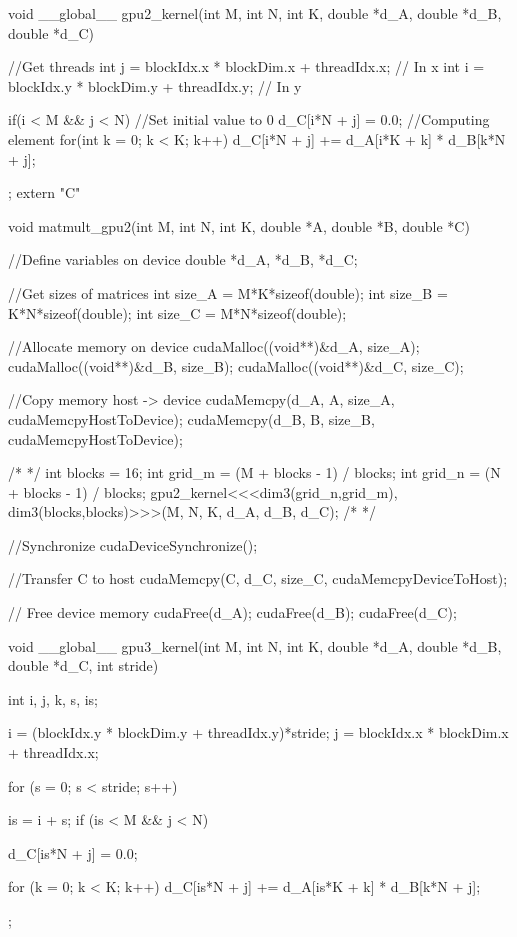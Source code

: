void __global__ gpu2_kernel(int M, int N, int K, double *d_A, double *d_B, double *d_C){
    //Get threads
    int j = blockIdx.x * blockDim.x + threadIdx.x;  // In x
    int i = blockIdx.y * blockDim.y + threadIdx.y;  // In y
    
    if(i < M && j < N) { 
        //Set initial value to 0
        d_C[i*N + j] = 0.0;
        //Computing element
        for(int k = 0; k < K; k++){
            d_C[i*N + j] += d_A[i*K + k] * d_B[k*N + j];
        }
    }
};
extern "C" { 
void matmult_gpu2(int M, int N, int K, double *A, double *B, double *C) { 

    //Define variables on device
    double *d_A, *d_B, *d_C;

    //Get sizes of matrices
    int size_A = M*K*sizeof(double);
    int size_B = K*N*sizeof(double);
    int size_C = M*N*sizeof(double);

    //Allocate memory on device
    cudaMalloc((void**)&d_A, size_A);
    cudaMalloc((void**)&d_B, size_B);
    cudaMalloc((void**)&d_C, size_C);

    //Copy memory host -> device
    cudaMemcpy(d_A, A, size_A, cudaMemcpyHostToDevice);
    cudaMemcpy(d_B, B, size_B, cudaMemcpyHostToDevice); 

    /* */
    int blocks = 16;
    int grid_m = (M + blocks - 1) / blocks;
    int grid_n = (N + blocks - 1) / blocks;
    gpu2_kernel<<<dim3(grid_n,grid_m), dim3(blocks,blocks)>>>(M, N, K, d_A, d_B, d_C);
    /* */
    
    //Synchronize
    cudaDeviceSynchronize(); 
    
    //Transfer C to host
    cudaMemcpy(C, d_C, size_C, cudaMemcpyDeviceToHost);

    // Free device memory
    cudaFree(d_A);
    cudaFree(d_B);
    cudaFree(d_C);
}
}



void __global__ gpu3_kernel(int M, int N, int K, double *d_A, double *d_B, double *d_C, int stride){
    int i, j, k, s, is;

    i = (blockIdx.y * blockDim.y + threadIdx.y)*stride;
    j = blockIdx.x * blockDim.x + threadIdx.x;

    for (s = 0; s < stride; s++){
        is = i + s;
        if (is < M && j < N){
            d_C[is*N + j] = 0.0;

            for (k = 0; k < K; k++)
                d_C[is*N + j] += d_A[is*K + k] * d_B[k*N + j];
        }
    }
};

